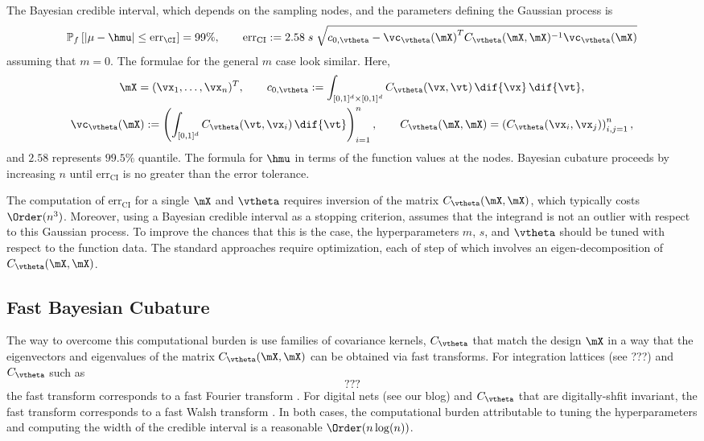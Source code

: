 The Bayesian credible interval, which depends on the sampling nodes, and the parameters defining the Gaussian process is \cite{RatHic19a}
\begin{equation*}
 \mathbb{P}_f \left[
|\mu-\hmu| \leq \text{err}_\CI
\right] = 99\%, \qquad
{\text{err}_{\text{CI}}} := 2.58 \; s \; \sqrt{c_{0,{\vtheta}} - {\vc_{\vtheta}(\mX)}^T C_{\vtheta}(\mX,\mX)^{-1}\vc_{\vtheta}(\mX)}
\end{equation*}
assuming that $m = 0$. The formulae for the general $m$ case look similar. Here,
\begin{gather*}
\label{eqn:fGaussDist_c0}
	\mX = ({\vx}_1, \ldots, {\vx}_n)^T, \qquad c_{0,{\vtheta}} := \int_{[0,1]^{d} \times [0,1]^{d}} C_{\vtheta} (\vx,\vt) \, \dif{\vx} \, \dif{\vt}, \\
 \vc_{\vtheta}(\mX) := \left(  \int_{[0,1]^d} C_{\vtheta} (\vt,\vx_i) \, \dif{\vt} \right)_{i=1}^n, \qquad C_{\vtheta}(\mX,\mX) = \left(  C_{\vtheta}({\vx}_i,{\vx}_j)  \right)_{i,j=1}^n,
	\end{gather*}
and $2.58$ represents $99.5\%$ quantile.  The formula for $\hmu$ in terms of the function values at the nodes.
Bayesian cubature proceeds by increasing $n$ until $\text{err}_{\text{CI}}$ is no greater than the error tolerance.  

The computation of $\text{err}_{\text{CI}}$ for a single $\mX$ and $\vtheta$ requires  inversion of the matrix $ C_{\vtheta}(\mX,\mX)$, which typically costs $\Order(n^3)$.  Moreover, using a Bayesian credible interval as a stopping criterion, assumes that the integrand is not an outlier with respect to this Gaussian process.  To improve the chances that this is the case, the hyperparameters $m$, $s$, and $\vtheta$ should be tuned with respect to the function data.  The standard approaches require optimization, each of step of which involves an eigen-decomposition of $ C_{\vtheta}(\mX,\mX)$.

\subsection*{Fast Bayesian Cubature}
The way to overcome this computational burden is use families of covariance kernels, $C_\vtheta$ that match the design $\mX$ in a way that the eigenvectors and eigenvalues of the matrix $C_{\vtheta}(\mX,\mX)$ can be obtained via fast transforms.  For integration lattices (see ???) and $C_\vtheta$ such as 
\begin{equation}
	???
\end{equation}
the fast transform corresponds to a fast Fourier transform \cite{RatHic19a,??}.  For digital nets (see our blog) and $C_\vtheta$ that are digitally-shfit invariant, the fast transform corresponds to a fast Walsh transform \cite{Jag19a,???}.  In both cases, the computational burden attributable to tuning the hyperparameters and computing the width of the credible interval is a reasonable $\Order(n \log(n))$.

